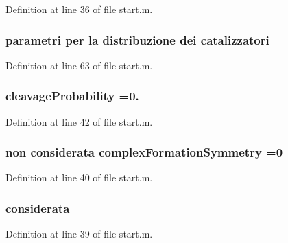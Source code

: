 Definition at line 36 of file start.\-m.

\hypertarget{a00071_a5a2da1d1b50e51c66813f40da0d9d0d1}{
\subsubsection[{catalizzatori}]{\setlength{\rightskip}{0pt plus 5cm}parametri per la distribuzione dei catalizzatori}}\label{a00071_a5a2da1d1b50e51c66813f40da0d9d0d1}


Definition at line 63 of file start.\-m.

\hypertarget{a00071_a9d512df05ee559766d2b8f08e4704b04}{
\subsubsection[{cleavage\-Probability}]{\setlength{\rightskip}{0pt plus 5cm}cleavage\-Probability =0.}}\label{a00071_a9d512df05ee559766d2b8f08e4704b04}


Definition at line 42 of file start.\-m.

\hypertarget{a00071_ac5d9cfec5453da5efc3e8d574b455833}{
\subsubsection[{complex\-Formation\-Symmetry}]{ non {\bf considerata} complex\-Formation\-Symmetry =0}}\label{a00071_ac5d9cfec5453da5efc3e8d574b455833}


Definition at line 40 of file start.\-m.

\hypertarget{a00071_ad76697f83c5d8bf201c45822af227e21}{
\subsubsection[{considerata}]{ considerata}}\label{a00071_ad76697f83c5d8bf201c45822af227e21}


Definition at line 39 of file start.\-m.


